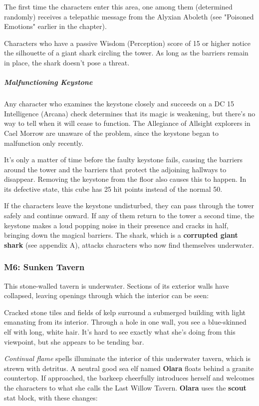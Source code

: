 \documentclass[10pt,a4paper,twoside,fancy,bg=print,twocolumn,openany,nodeprecatedcode]{dndbook}
\begin{document}
The first time the characters enter this area, one among them (determined randomly) receives a telepathic message from the Alyxian Aboleth (see "Poisoned Emotions" earlier in the chapter).

Characters who have a passive Wisdom (Perception) score of 15 or higher notice the silhouette of a giant shark circling the tower. As long as the barriers remain in place, the shark doesn't pose a threat.

\subparagraph{Malfunctioning Keystone}
Any character who examines the keystone closely and succeeds on a DC 15 Intelligence (Arcana) check determines that its magic is weakening, but there's no way to tell when it will cease to function. The Allegiance of Allsight explorers in Cael Morrow are unaware of the problem, since the keystone began to malfunction only recently.

It's only a matter of time before the faulty keystone fails, causing the barriers around the tower and the barriers that protect the adjoining hallways to disappear. Removing the keystone from the floor also causes this to happen. In its defective state, this cube has 25 hit points instead of the normal 50.

If the characters leave the keystone undisturbed, they can pass through the tower safely and continue onward. If any of them return to the tower a second time, the keystone makes a loud popping noise in their presence and cracks in half, bringing down the magical barriers. The shark, which is a \textbf{corrupted giant shark} (see appendix A), attacks characters who now find themselves underwater.

\subsubsection{M6: Sunken Tavern}
This stone-walled tavern is underwater. Sections of its exterior walls have collapsed, leaving openings through which the interior can be seen:

\begin{DndReadAloud}{}
Cracked stone tiles and fields of kelp surround a submerged building with light emanating from its interior. Through a hole in one wall, you see a blue-skinned elf with long, white hair. It's hard to see exactly what she's doing from this viewpoint, but she appears to be tending bar.

\end{DndReadAloud}

\textit{Continual flame} spells illuminate the interior of this underwater tavern, which is strewn with detritus. A neutral good sea elf named \textbf{Olara} floats behind a granite countertop. If approached, the barkeep cheerfully introduces herself and welcomes the characters to what she calls the Last Willow Tavern. \textbf{Olara} uses the \textbf{scout} stat block, with these changes:
\end{document}
